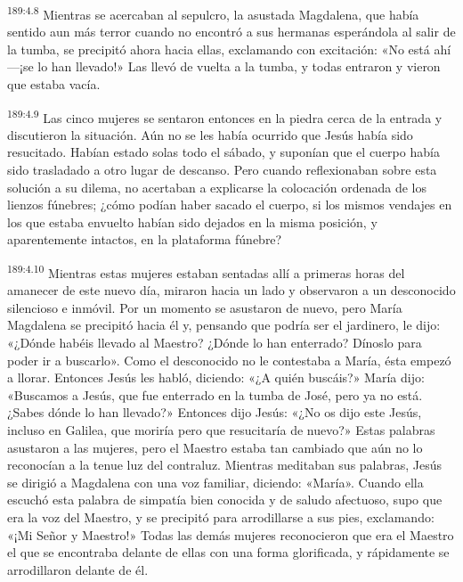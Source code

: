 \par 
\textsuperscript{189:4.8} Mientras se acercaban al sepulcro, la asustada Magdalena, que había sentido aun más terror cuando no encontró a sus hermanas esperándola al salir de la tumba, se precipitó ahora hacia ellas, exclamando con excitación: «No está ahí ---¡se lo han llevado!» Las llevó de vuelta a la tumba, y todas entraron y vieron que estaba vacía.

\par 
\textsuperscript{189:4.9} Las cinco mujeres se sentaron entonces en la piedra cerca de la entrada y discutieron la situación. Aún no se les había ocurrido que Jesús había sido resucitado. Habían estado solas todo el sábado, y suponían que el cuerpo había sido trasladado a otro lugar de descanso. Pero cuando reflexionaban sobre esta solución a su dilema, no acertaban a explicarse la colocación ordenada de los lienzos fúnebres; ¿cómo podían haber sacado el cuerpo, si los mismos vendajes en los que estaba envuelto habían sido dejados en la misma posición, y aparentemente intactos, en la plataforma fúnebre?

\par 
\textsuperscript{189:4.10} Mientras estas mujeres estaban sentadas allí a primeras horas del amanecer de este nuevo día, miraron hacia un lado y observaron a un desconocido silencioso e inmóvil. Por un momento se asustaron de nuevo, pero María Magdalena se precipitó hacia él y, pensando que podría ser el jardinero, le dijo: «¿Dónde habéis llevado al Maestro? ¿Dónde lo han enterrado? Dínoslo para poder ir a buscarlo». Como el desconocido no le contestaba a María, ésta empezó a llorar. Entonces Jesús les habló, diciendo: «¿A quién buscáis?» María dijo: «Buscamos a Jesús, que fue enterrado en la tumba de José, pero ya no está. ¿Sabes dónde lo han llevado?» Entonces dijo Jesús: «¿No os dijo este Jesús, incluso en Galilea, que moriría pero que resucitaría de nuevo?» Estas palabras asustaron a las mujeres, pero el Maestro estaba tan cambiado que aún no lo reconocían a la tenue luz del contraluz. Mientras meditaban sus palabras, Jesús se dirigió a Magdalena con una voz familiar, diciendo: «María». Cuando ella escuchó esta palabra de simpatía bien conocida y de saludo afectuoso, supo que era la voz del Maestro, y se precipitó para arrodillarse a sus pies, exclamando: «¡Mi Señor y Maestro!» Todas las demás mujeres reconocieron que era el Maestro el que se encontraba delante de ellas con una forma glorificada, y rápidamente se arrodillaron delante de él.

